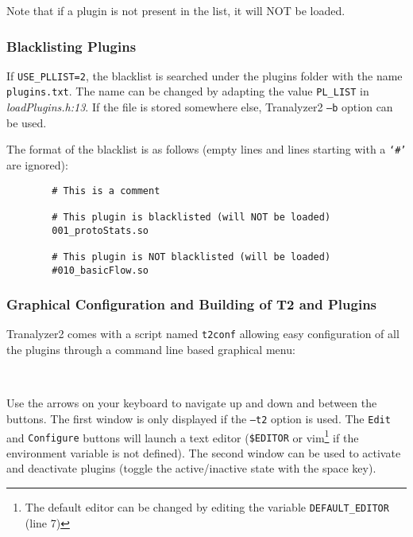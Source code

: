 Note that if a plugin is not present in the list, it will NOT be loaded.

\subsubsection{Blacklisting Plugins}
If {\tt USE\_PLLIST=2}, the blacklist is searched under the plugins folder with the name {\tt plugins.txt}.
The name can be changed by adapting the value {\tt PL\_LIST} in {\em loadPlugins.h:13}.
If the file is stored somewhere else, Tranalyzer2 {\tt --b} option can be used.

The format of the blacklist is as follows (empty lines and lines starting with a {\tt `\#'} are ignored):
\begin{verbatim}
        # This is a comment

        # This plugin is blacklisted (will NOT be loaded)
        001_protoStats.so

        # This plugin is NOT blacklisted (will be loaded)
        #010_basicFlow.so
\end{verbatim}

\subsubsection{Graphical Configuration and Building of T2 and Plugins}\label{sss:t2conf}
Tranalyzer2 comes with a script named {\tt t2conf} allowing easy configuration of all the plugins through a command line based graphical menu:

\begin{figure}[!ht]
    \centering
    \begin{minipage}[b]{0.45\linewidth}
    \end{minipage}
    ~
    \begin{minipage}[b]{0.45\linewidth}
    \end{minipage}
\end{figure}

Use the arrows on your keyboard to navigate up and down and between the buttons. The first window is only displayed if the {\tt --t2} option is used. The {\tt Edit} and {\tt Configure} buttons will launch a text editor ({\tt \$EDITOR} or vim\footnote{The default editor can be changed by editing the variable {\tt DEFAULT\_EDITOR} (line 7)} if the environment variable is not defined). The second window can be used to activate and deactivate plugins (toggle the active/inactive state with the space key).

